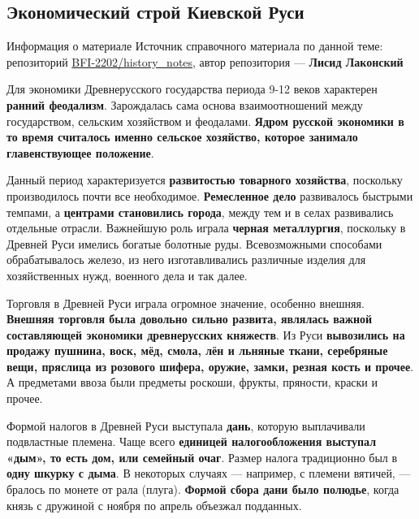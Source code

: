 \documentclass{article}
\begin{document}
\subsection{Экономический строй Киевской Руси}

\begin{bclogo}[logo=\bcinfo, couleurBarre=orange, noborder=true, couleur=white]{Информация о материале}
    Источник справочного материала по данной теме: репозиторий \href{https://github.com/BFI-2202/history_notes}{BFI-2202/history\_notes}, автор репозитория — \textbf{Лисид Лаконский}
\end{bclogo}

Для экономики Древнерусского государства периода 9-12 веков характерен \textbf{ранний феодализм}.
Зарождалась сама основа взаимоотношений между государством, сельским хозяйством и феодалами. \textbf{Ядром русской экономики в то время считалось именно сельское хозяйство, которое занимало главенствующее положение}.

Данный период характеризуется \textbf{развитостью товарного хозяйства}, поскольку производилось почти все необходимое. \textbf{Ремесленное дело} развивалось быстрыми темпами, а \textbf{центрами становились города}, между тем и в селах развивались отдельные отрасли. Важнейшую роль играла \textbf{черная металлургия}, поскольку в Древней Руси имелись богатые болотные руды. Всевозможными способами обрабатывалось железо, из него изготавливались различные изделия для хозяйственных нужд, военного дела и так далее.

\hfill

Торговля в Древней Руси играла огромное значение, особенно внешняя. \textbf{Внешняя торговля была довольно сильно развита, являлась важной составляющей экономики древнерусских княжеств}. Из Руси \textbf{вывозились на продажу пушнина, воск, мёд, смола, лён и льняные ткани, серебряные вещи, пряслица из розового шифера, оружие, замки, резная кость и прочее}. А предметами ввоза были предметы роскоши, фрукты, пряности, краски и прочее.

\hfill

Формой налогов в Древней Руси выступала \textbf{дань}, которую выплачивали подвластные племена. Чаще всего \textbf{единицей налогообложения выступал «дым», то есть дом, или семейный очаг}. Размер налога традиционно был в \textbf{одну шкурку с дыма}. В некоторых случаях — например, с племени вятичей, — бралось по монете от рала (плуга). \textbf{Формой сбора дани было полюдье}, когда князь с дружиной с ноября по апрель объезжал подданных.
\end{document}
